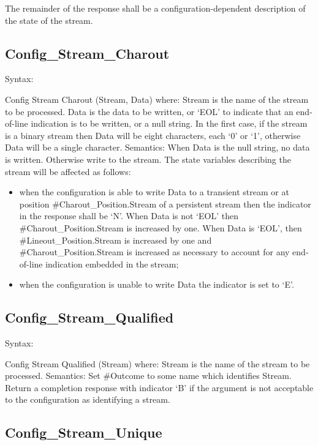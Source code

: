 The remainder of the response shall be a configuration-dependent
description of the state of the stream.

\subsection{Config\_Stream\_Charout}\label{config_stream_charout}

Syntax:

Config Stream Charout (Stream, Data) where: Stream is the name of the
stream to be processed. Data is the data to be written, or `EOL' to
indicate that an end-of-line indication is to be written, or a null
string. In the first case, if the stream is a binary stream then Data
will be eight characters, each `0' or `1', otherwise Data will be a
single character. Semantics: When Data is the null string, no data is
written. Otherwise write to the stream. The state variables describing
the stream will be affected as follows:

\begin{itemize}
\item
  when the configuration is able to write Data to a transient stream or
  at position \#Charout\_Position.Stream of a persistent stream then the
  indicator in the response shall be `N'. When Data is not `EOL' then
  \#Charout\_Position.Stream is increased by one. When Data is `EOL',
  then \#Lineout\_Position.Stream is increased by one and
  \#Charout\_Position.Stream is increased as necessary to account for
  any end-of-line indication embedded in the stream;
\item
  when the configuration is unable to write Data the indicator is set to
  `E'.
\end{itemize}

\subsection{Config\_Stream\_Qualified}\label{config_stream_qualified}

Syntax:

Config Stream Qualified (Stream) where: Stream is the name of the stream
to be processed. Semantics: Set \#Outcome to some name which identifies
Stream. Return a completion response with indicator `B' if the argument
is not acceptable to the configuration as identifying a stream.

\subsection{Config\_Stream\_Unique}\label{config_stream_unique}

